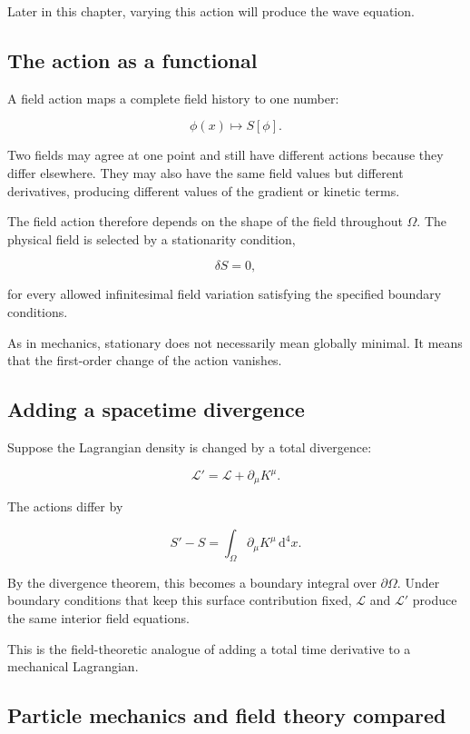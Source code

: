 Later in this chapter, varying this action will produce the wave equation.

\subsection{The action as a functional}

A field action maps a complete field history to one number:

\[
\phi(x)
\longmapsto
S[\phi].
\]

Two fields may agree at one point and still have different actions because they differ elsewhere. They may also have the same field values but different derivatives, producing different values of the gradient or kinetic terms.

The field action therefore depends on the shape of the field throughout \(\Omega\). The physical field is selected by a stationarity condition,

\[
\delta S=0,
\]

for every allowed infinitesimal field variation satisfying the specified boundary conditions.

As in mechanics, stationary does not necessarily mean globally minimal. It means that the first-order change of the action vanishes.

\subsection{Adding a spacetime divergence}

Suppose the Lagrangian density is changed by a total divergence:

\[
\mathcal{L}'
=
\mathcal{L}
+
\partial_{\mu}K^{\mu}.
\]

The actions differ by

\[
S'-S
=
\int_{\Omega}
\partial_{\mu}K^{\mu}
\,\mathrm{d}^{4}x.
\]

By the divergence theorem, this becomes a boundary integral over \(\partial\Omega\). Under boundary conditions that keep this surface contribution fixed, \(\mathcal{L}\) and \(\mathcal{L}'\) produce the same interior field equations.

This is the field-theoretic analogue of adding a total time derivative to a mechanical Lagrangian.

\subsection{Particle mechanics and field theory compared}

